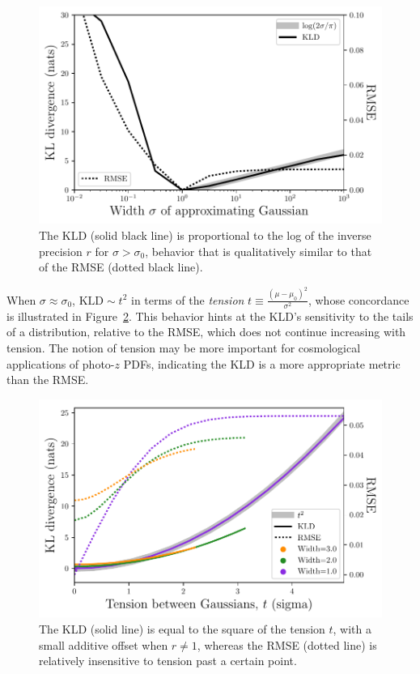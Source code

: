 \documentclass[\docopts]{\docclass}
\newcommand{\pz}{photo-$z$ PDF}
\begin{document}
\begin{figure}
  \begin{center}
    \includegraphics[width=\columnwidth]{figures/precision.pdf}
    \caption{The KLD (solid black line) is proportional to the log of the 
inverse precision $r$ for $\sigma>\sigma_{0}$, behavior that is qualitatively 
similar to that of the RMSE (dotted black line).
    \label{fig:precision}}
  \end{center}
\end{figure}

When $\sigma\approx\sigma_{0}$, $\mathrm{KLD}\sim t^{2}$ in terms of the 
\textit{tension} $t\equiv\frac{(\mu-\mu_{0})^{2}}{\sigma^{2}}$, whose 
concordance is illustrated in Figure~\ref{fig:tension}.  This behavior hints at 
the KLD's sensitivity to the tails of a distribution, relative to the RMSE, 
which does not continue increasing with tension.  The notion of tension may be 
more important for cosmological applications of \pz s, indicating the KLD is a 
more appropriate metric than the RMSE.

\begin{figure}
  \begin{center}
    \includegraphics[width=\columnwidth]{figures/tension.pdf}
    \caption{The KLD (solid line) is equal to the square of the tension $t$, 
with a small additive offset when $r\neq1$, whereas the RMSE (dotted line) is 
relatively insensitive to tension past a certain point.
    \label{fig:tension}}
  \end{center}
\end{figure}
\end{document}
